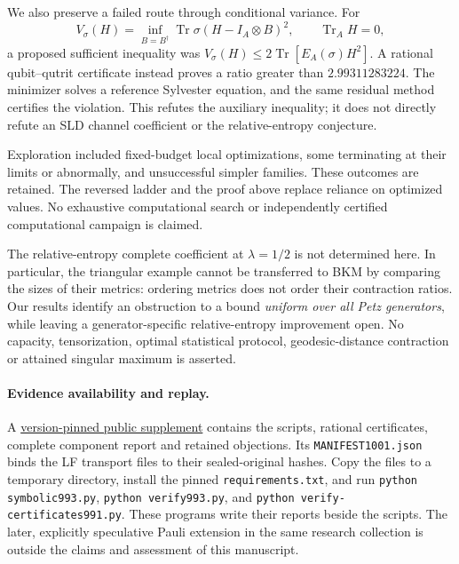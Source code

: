 \documentclass[11pt]{article}
\newcommand{\Tr}{\operatorname{Tr}}
\theoremstyle{remark}
\begin{document}
We also preserve a failed route through conditional variance. For
\[
 V_\sigma(H)=\inf_{B=B^\dagger}\Tr\sigma(H-I_A\otimes B)^2,
 \qquad \Tr_AH=0,
\]
a proposed sufficient inequality was
\(V_\sigma(H)\le2\Tr[E_A(\sigma)H^2]\).
A rational qubit--qutrit certificate instead proves a ratio greater than \(2.99311283224\).
The minimizer solves a reference Sylvester equation, and the same residual method certifies the violation.
This refutes the auxiliary inequality; it does not directly refute an SLD channel coefficient or the relative-entropy conjecture.

Exploration included fixed-budget local optimizations, some terminating at their limits or abnormally, and unsuccessful simpler families.
These outcomes are retained. The reversed ladder and the proof above replace reliance on optimized values.
No exhaustive computational search or independently certified computational campaign is claimed.

The relative-entropy complete coefficient at \(\lambda=1/2\) is not determined here.
In particular, the triangular example cannot be transferred to BKM by comparing the sizes of their metrics: ordering metrics does not order their contraction ratios.
Our results identify an obstruction to a bound \emph{uniform over all Petz generators}, while leaving a generator-specific relative-entropy improvement open.
No capacity, tensorization, optimal statistical protocol, geodesic-distance contraction or attained singular maximum is asserted.


\paragraph{Evidence availability and replay.}
A \href{https://github.com/lluiseriksson/physmath-knowledge-tree/tree/f0b3642b196b9de6d51b31cca49a69818522ee91/integrations/research-radar/evidence/2026-10-27-pauli-audit}{version-pinned public supplement}
contains the scripts, rational certificates, complete component report and retained objections.
Its \texttt{MANIFEST1001.json} binds the LF transport files to their sealed-original hashes.
Copy the files to a temporary directory, install the pinned \texttt{requirements.txt}, and run
\texttt{python symbolic993.py}, \texttt{python verify993.py}, and
\texttt{python verify-certificates991.py}. These programs write their reports beside the scripts.
The later, explicitly speculative Pauli extension in the same research collection is outside the claims and assessment of this manuscript.
\end{document}
